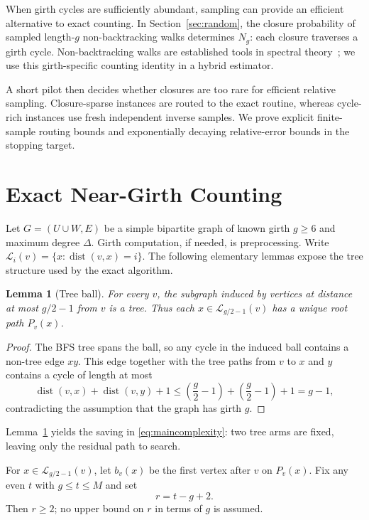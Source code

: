 \documentclass[conference]{IEEEtran}
\newtheorem{lemma}{Lemma}
\newcommand{\dist}{\operatorname{dist}}
\newcommand{\cL}{\mathcal{L}}
\begin{document}
When girth cycles are sufficiently abundant, sampling can provide
an efficient alternative to exact counting. In Section~\ref{sec:random}, the closure probability of sampled length-$g$
non-backtracking walks determines $N_g$: each closure traverses a girth cycle.
Non-backtracking walks are established tools in spectral
theory~\cite{bass1992};
we use this girth-specific counting identity in a hybrid estimator.

A short pilot then decides whether closures are too rare for efficient
relative sampling. Closure-sparse instances are routed to the exact routine,
whereas cycle-rich instances use fresh independent inverse samples. We prove explicit finite-sample
routing bounds and exponentially decaying relative-error bounds in the
stopping target.

\section{Exact Near-Girth Counting}\label{sec:exact}
Let $G=(U\cup W,E)$ be a simple bipartite graph of known girth $g\ge6$
and maximum degree $\Delta$. Girth computation, if needed, is preprocessing.
Write $\cL_i(v)=\{x:\dist(v,x)=i\}$. The following elementary lemmas expose
the tree structure used by the exact algorithm.

\begin{lemma}[Tree ball]\label{lem:tree}
For every $v$, the subgraph induced by vertices at distance at most $g/2-1$
from $v$ is a tree.  Thus each $x\in\cL_{g/2-1}(v)$ has a unique root path
$P_v(x)$.
\end{lemma}
\begin{proof}
The BFS tree spans the ball, so any cycle in the induced ball contains a
non-tree edge $xy$. This edge together with the tree paths from $v$ to $x$
and $y$ contains a cycle of length at most
\[
\dist(v,x)+\dist(v,y)+1\le
\left(\frac{g}{2}-1\right)+\left(\frac{g}{2}-1\right)+1
=g-1,
\]
contradicting the assumption that the graph has girth $g$.
\end{proof}

Lemma~\ref{lem:tree} yields the saving in
\eqref{eq:maincomplexity}: two tree arms are fixed,
leaving only the residual path to search.

For $x\in\cL_{g/2-1}(v)$, let $b_v(x)$ be the first vertex after $v$ on
$P_v(x)$.  Fix any even $t$ with $g\le t\le M$ and set
\begin{equation}\label{eq:rdef}
 r=t-g+2.
\end{equation}
Then $r\ge2$; no upper bound on $r$ in terms of $g$ is assumed.
\end{document}
